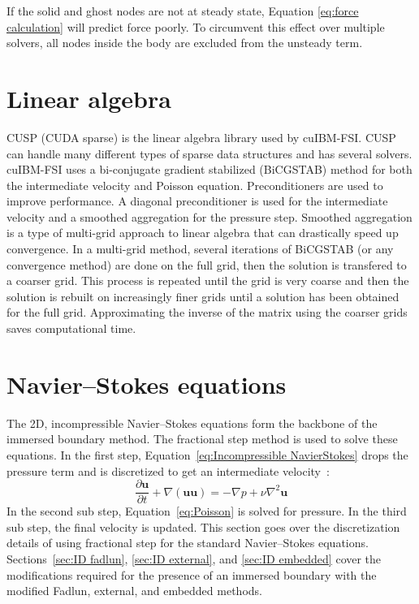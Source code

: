 If the solid and ghost nodes are not at steady state, Equation \eqref{eq:force calculation} will predict force poorly. 
To circumvent this effect over multiple solvers, all nodes inside the body are excluded from the unsteady term. 

\section{Linear algebra}
\label{Preconditioning and Linear Algebra Solvers}
CUSP (CUDA sparse) is the linear algebra library used by cuIBM-FSI. 
CUSP can handle many different types of sparse data structures and has several solvers. 
cuIBM-FSI uses a bi-conjugate gradient stabilized (BiCGSTAB) method for both the intermediate velocity and Poisson equation. 
Preconditioners are used to improve performance. 
A diagonal preconditioner is used for the intermediate velocity and a smoothed aggregation for the pressure step. 
Smoothed aggregation is a type of multi-grid approach to linear algebra that can drastically speed up convergence. 
In a multi-grid method, several iterations of BiCGSTAB (or any convergence method) are done on the full grid, then the solution is transfered to a coarser grid. 
This process is repeated until the grid is very coarse and then the solution is rebuilt on increasingly finer grids until a solution has been obtained for the full grid. 
Approximating the inverse of the matrix using the coarser grids saves computational time. 
\section{Navier--Stokes equations}
\label{ID:Navier Stokes}

The 2D, incompressible Navier--Stokes equations form the backbone of the immersed boundary method. 
The fractional step method is used to solve these equations. 
In the first step, Equation~\eqref{eq:Incompressible NavierStokes} drops the pressure term and is discretized to get an intermediate velocity~\cite{Perot1993}: 
\begin{equation}
\frac{\partial \textbf{u}}{\partial t} + \nabla ( \textbf{uu} ) = -\nabla p + \nu\nabla^{2}\textbf{u} \label{eq:Incompressible NavierStokes}
\end{equation}
In the second sub step, Equation~\eqref{eq:Poisson} is solved for pressure. 
In the third sub step, the final velocity is updated. 
This section goes over the discretization details of using fractional step for the standard Navier--Stokes equations. 
Sections~\ref{sec:ID fadlun}, \ref{sec:ID external}, and \ref{sec:ID embedded} cover the modifications required for the presence of an immersed boundary with the modified Fadlun, external, and embedded methods. 


